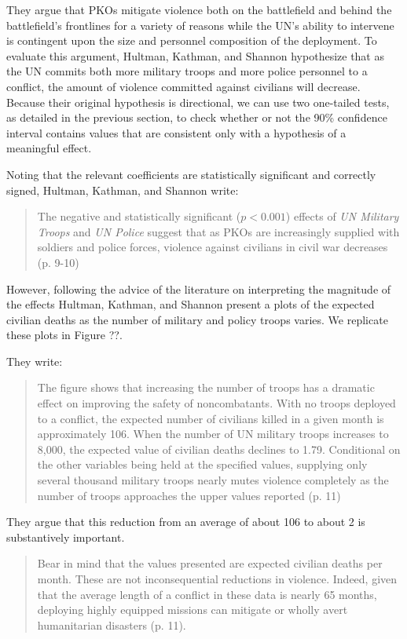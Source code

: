 \documentclass[12pt]{article}
\begin{document}
They argue that PKOs mitigate violence both on the battlefield and behind the battlefield's frontlines for a variety of reasons while the UN's ability to intervene is contingent upon the size and personnel composition of the deployment. To evaluate this argument, Hultman, Kathman, and Shannon hypothesize that as the UN commits both more military troops and more police personnel to a conflict, the amount of violence committed against civilians will decrease. Because their original hypothesis is directional, we can use two one-tailed tests, as detailed in the previous section, to check whether or not the 90\% confidence interval contains values that are consistent only with a hypothesis of a meaningful effect. 

Noting that the relevant coefficients are statistically significant and correctly signed, Hultman, Kathman, and Shannon write:

\begin{quote}
The negative and statistically significant ($p < 0.001$) effects of \textit{UN Military Troops} and \textit{UN Police} suggest that as PKOs are increasingly supplied with soldiers and police forces, violence against civilians in civil war decreases (p. 9-10)
\end{quote}

However, following the advice of the literature on interpreting the magnitude of the effects Hultman, Kathman, and Shannon present a plots of the expected civilian deaths as the number of military and policy troops varies. We replicate these plots in Figure ??.

They write:

\begin{quote}
The figure shows that increasing the number of troops has a dramatic effect on improving the safety of noncombatants. With no troops deployed to a conflict, the expected number of civilians killed in a given month is approximately 106. When the number of UN military troops increases to 8,000, the expected value of civilian deaths declines to 1.79. Conditional on the other variables being held at the specified values, supplying only several thousand military troops nearly mutes violence completely as the number of troops approaches the upper values reported (p. 11)
\end{quote}

They argue that this reduction from an average of about 106 to about 2 is substantively important.

\begin{quote}
Bear in mind that the values presented are expected civilian deaths per month. These are not inconsequential reductions in violence. Indeed, given that the average length of a conflict in these data is nearly 65 months, deploying highly equipped missions can mitigate or wholly avert humanitarian disasters (p. 11).
\end{quote}
\end{document}
